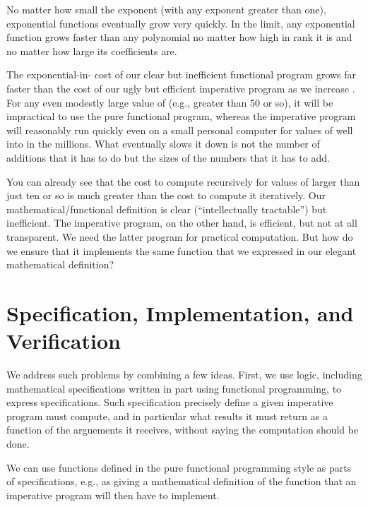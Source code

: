 \documentclass[letterpaper,10pt,english]{sphinxmanual}
\begin{document}
No matter how small the exponent (with any exponent greater than one),
exponential functions eventually grow very quickly. In the limit, any
exponential function grows faster than any polynomial no matter how
high in rank it is and no matter how large its coefficients are.

The exponential-in- cost of our clear but inefficient functional
program grows far faster than the cost of our ugly but efficient
imperative program as we increase .  For any even modestly large
value of  (e.g., greater than 50 or so), it will be impractical to
use the pure functional program, whereas the imperative program will
reasonably run quickly even on a small personal computer for values of
 well into in the millions.  What eventually slows it down is not
the number of additions that it has to do but the sizes of the numbers
that it has to add.

You can already see that the cost to compute  recursively for
values of  larger than just ten or so is much greater than the cost
to compute it iteratively. Our mathematical/functional definition is
clear (“intellectually tractable”) but inefficient. The imperative
program, on the other hand, is efficient, but not at all transparent.
We need the latter program for practical computation. But how do we
ensure that it implements the same function that we expressed in our
elegant mathematical definition?


\section{Specification, Implementation, and Verification}
\label{\detokenize{05-putting-it-together:specification-implementation-and-verification}}
We address such problems by combining a few ideas. First, we use
logic, including mathematical specifications written in part using
functional programming, to express  specifications.  Such
specification precisely define  a given imperative program must
compute, and in particular what results it must return as a function
of the arguements it receives, without saying  the computation
should be done.

We can use functions defined in the pure functional programming style
as parts of specifications, e.g., as giving a mathematical definition
of the  function that an imperative program will then have
to implement.
\end{document}
